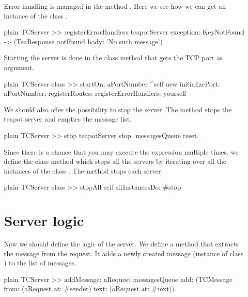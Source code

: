 \documentclass[10pt,twoside,english]{_support/latex/sbabook/sbabook}
\begin{document}
Error handling is managed in the method . Here we see how we can get an instance of the class .

\begin{displaycode}{plain}
TCServer >> registerErrorHandlers
	teapotServer
		exception: KeyNotFound -> (TeaResponse notFound body: 'No such message')
\end{displaycode}

Starting the server is done in the class method  that gets the TCP port as argument. 

\begin{displaycode}{plain}
TCServer class >> startOn: aPortNumber
	^self new
		initializePort: aPortNumber;
		registerRoutes;
		registerErrorHandlers;
		yourself
\end{displaycode}

We should also offer the possibility to stop the server. The method  stops the teapot server and empties the message list. 

\begin{displaycode}{plain}
TCServer >> stop
	teapotServer stop.
	messagesQueue reset.
\end{displaycode}

Since there is a chance that you may execute the expression  multiple times, we define the class method   which stops all the servers by iterating over all the instances of the class . 
The method  stops each server. 

\begin{displaycode}{plain}
TCServer class >> stopAll
	self allInstancesDo: #stop
\end{displaycode}
\section{Server logic}
Now we should define the logic of the server.
We define a method  that extracts the message from the request. It adds a newly created message (instance of class ) to the list of messages.

\begin{displaycode}{plain}
TCServer >> addMessage: aRequest
	messagesQueue add: (TCMessage from: (aRequest at: #sender) text: (aRequest at: #text)).
\end{displaycode}
\end{document}
